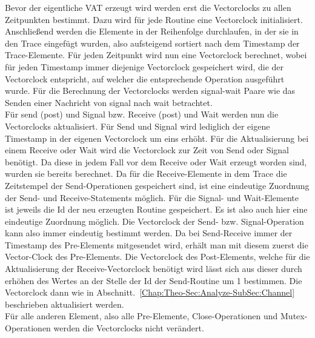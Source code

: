 Bevor der eigentliche VAT erzeugt wird werden erst die Vectorclocks zu allen
Zeitpunkten bestimmt. Dazu wird für jede Routine eine Vectorclock initialisiert. 
Anschließend werden die Elemente in der Reihenfolge durchlaufen, in der sie 
in den Trace eingefügt wurden, also aufsteigend sortiert nach dem Timestamp 
der Trace-Elemente. Für jeden Zeitpunkt wird nun eine Vectorclock berechnet,
wobei für jeden Timestamp immer diejenige Vectorclock gespeichert wird, die 
der Vectorclock entspricht, auf welcher die entsprechende Operation ausgeführt wurde.
Für die Berechnung der Vectorclocks werden signal-wait Paare wie das Senden 
einer Nachricht von signal nach wait betrachtet.\\
Für send (post) und Signal bzw. Receive (post) und Wait werden nun die Vectorclocks 
aktualisiert.
Für Send und Signal wird lediglich der eigene Timestamp in der eigenen 
Vectorclock um eins erhöht. Für die Aktualisierung bei einem Receive oder Wait 
wird die Vectorclock zur Zeit von Send oder Signal benötigt. Da diese in jedem 
Fall vor dem Receive oder Wait erzeugt worden sind, wurden sie bereits berechnet.
Da für die Receive-Elemente in dem Trace die Zeitstempel der Send-Operationen 
gespeichert sind, ist eine eindeutige Zuordnung der Send- und Receive-Statements 
möglich. Für die Signal- und Wait-Elemente ist jeweils die Id der neu erzeugten 
Routine gespeichert. Es ist also auch hier eine eindeutige Zuordnung möglich. 
Die Vectorclock der Send- bzw. Signal-Operation kann also immer eindeutig bestimmt 
werden. Da bei Send-Receive immer der Timestamp des Pre-Elements mitgesendet
wird, erhält man mit diesem zuerst die Vector-Clock des Pre-Elements. Die 
Vectorclock des Post-Elements, welche für die Aktualisierung der Receive-Vectorclock
benötigt wird lässt sich aus dieser durch erhöhen des Wertes an der Stelle 
der Id der Send-Routine um 1 bestimmen.
Die Vectorclock dann wie in Abschnitt.~\ref{Chap:Theo-Sec:Analyze-SubSec:Channel}
beschrieben aktualisiert werden.\\
Für alle anderen Element, also alle Pre-Elemente, Close-Operationen und Mutex-Operationen 
werden die Vectorclocks nicht verändert.

